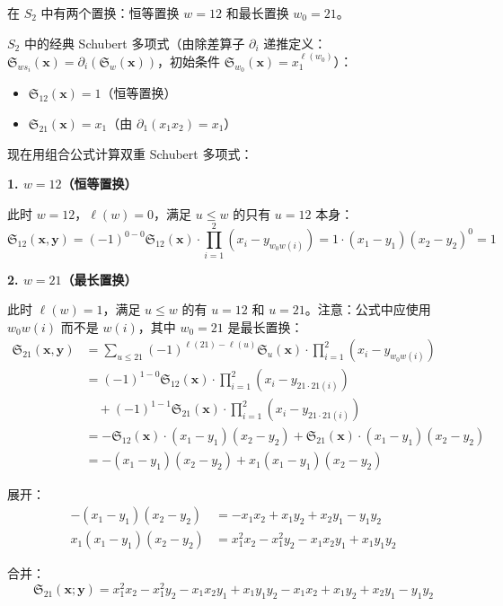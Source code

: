 \begin{Example}[$S_2$ 的计算]
\label{ex:DoubleSchubertS2}
在 $S_2$ 中有两个置换：恒等置换 $w = 12$ 和最长置换 $w_0 = 21$。

$S_2$ 中的经典 Schubert 多项式（由除差算子 $\partial_i$ 递推定义：$\mathfrak{S}_{ws_i}(\mathbf{x}) = \partial_i(\mathfrak{S}_w(\mathbf{x}))$，初始条件 $\mathfrak{S}_{w_0}(\mathbf{x}) = x_1^{\ell(w_0)}$）：
\begin{itemize}
\item $\mathfrak{S}_{12}(\mathbf{x}) = 1$（恒等置换）
\item $\mathfrak{S}_{21}(\mathbf{x}) = x_1$（由 $\partial_1(x_1 x_2) = x_1$）
\end{itemize}

现在用组合公式计算双重 Schubert 多项式：

\textbf{1. $w = 12$（恒等置换）}

此时 $w = 12$，$\ell(w) = 0$，满足 $u \leq w$ 的只有 $u = 12$ 本身：
$$\mathfrak{S}_{12}(\mathbf{x},\mathbf{y}) = (-1)^{0-0} \mathfrak{S}_{12}(\mathbf{x}) \cdot \prod_{i=1}^{2}(x_i - y_{w_0 w(i)}) = 1 \cdot (x_1 - y_1)(x_2 - y_2)^{0} = 1$$

\textbf{2. $w = 21$（最长置换）}

此时 $\ell(w) = 1$，满足 $u \leq w$ 的有 $u = 12$ 和 $u = 21$。注意：公式中应使用 $w_0 w(i)$ 而不是 $w(i)$，其中 $w_0 = 21$ 是最长置换：
\begin{align*}
\mathfrak{S}_{21}(\mathbf{x},\mathbf{y})
&= \sum_{u \leq 21} (-1)^{\ell(21)-\ell(u)} \mathfrak{S}_u(\mathbf{x}) \cdot \prod_{i=1}^{2}(x_i - y_{w_0 w(i)}) \\
&= (-1)^{1-0} \mathfrak{S}_{12}(\mathbf{x}) \cdot \prod_{i=1}^{2}(x_i - y_{21 \cdot 21(i)}) \\
&\quad + (-1)^{1-1} \mathfrak{S}_{21}(\mathbf{x}) \cdot \prod_{i=1}^{2}(x_i - y_{21 \cdot 21(i)}) \\
&= -\mathfrak{S}_{12}(\mathbf{x}) \cdot (x_1 - y_1)(x_2 - y_2) + \mathfrak{S}_{21}(\mathbf{x}) \cdot (x_1 - y_1)(x_2 - y_2) \\
&= -(x_1 - y_1)(x_2 - y_2) + x_1(x_1 - y_1)(x_2 - y_2)
\end{align*}

展开：
\begin{align*}
-(x_1 - y_1)(x_2 - y_2) &= -x_1x_2 + x_1y_2 + x_2y_1 - y_1y_2 \\
x_1(x_1 - y_1)(x_2 - y_2) &= x_1^2x_2 - x_1^2y_2 - x_1x_2y_1 + x_1y_1y_2
\end{align*}

合并：
$$\mathfrak{S}_{21}(\mathbf{x}; \mathbf{y}) = x_1^2x_2 - x_1^2y_2 - x_1x_2y_1 + x_1y_1y_2 - x_1x_2 + x_1y_2 + x_2y_1 - y_1y_2$$


\end{Example}
